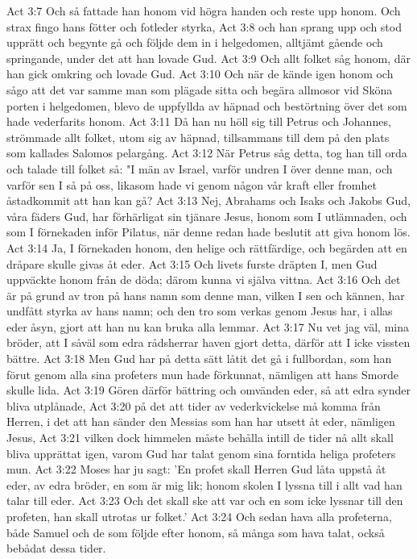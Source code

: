 Act 3:7  Och så fattade han honom vid högra handen och reste upp honom. Och strax fingo hans fötter och fotleder styrka,
Act 3:8  och han sprang upp och stod upprätt och begynte gå och följde dem in i helgedomen, alltjämt gående och springande, under det att han lovade Gud.
Act 3:9  Och allt folket såg honom, där han gick omkring och lovade Gud.
Act 3:10  Och när de kände igen honom och sågo att det var samme man som plägade sitta och begära allmosor vid Sköna porten i helgedomen, blevo de uppfyllda av häpnad och bestörtning över det som hade vederfarits honom.
Act 3:11  Då han nu höll sig till Petrus och Johannes, strömmade allt folket, utom sig av häpnad, tillsammans till dem på den plats som kallades Salomos pelargång.
Act 3:12  När Petrus såg detta, tog han till orda och talade till folket så: "I män av Israel, varför undren I över denne man, och varför sen I så på oss, likasom hade vi genom någon vår kraft eller fromhet åstadkommit att han kan gå?
Act 3:13  Nej, Abrahams och Isaks och Jakobs Gud, våra fäders Gud, har förhärligat sin tjänare Jesus, honom som I utlämnaden, och som I förnekaden inför Pilatus, när denne redan hade beslutit att giva honom lös.
Act 3:14  Ja, I förnekaden honom, den helige och rättfärdige, och begärden att en dråpare skulle givas åt eder.
Act 3:15  Och livets furste dräpten I, men Gud uppväckte honom från de döda; därom kunna vi själva vittna.
Act 3:16  Och det är på grund av tron på hans namn som denne man, vilken I sen och kännen, har undfått styrka av hans namn; och den tro som verkas genom Jesus har, i allas eder åsyn, gjort att han nu kan bruka alla lemmar.
Act 3:17  Nu vet jag väl, mina bröder, att I såväl som edra rådsherrar haven gjort detta, därför att I icke vissten bättre.
Act 3:18  Men Gud har på detta sätt låtit det gå i fullbordan, som han förut genom alla sina profeters mun hade förkunnat, nämligen att hans Smorde skulle lida.
Act 3:19  Gören därför bättring och omvänden eder, så att edra synder bliva utplånade,
Act 3:20  på det att tider av vederkvickelse må komma från Herren, i det att han sänder den Messias som han har utsett åt eder, nämligen Jesus,
Act 3:21  vilken dock himmelen måste behålla intill de tider nå allt skall bliva upprättat igen, varom Gud har talat genom sina forntida heliga profeters mun.
Act 3:22  Moses har ju sagt: 'En profet skall Herren Gud låta uppstå åt eder, av edra bröder, en som är mig lik; honom skolen I lyssna till i allt vad han talar till eder.
Act 3:23  Och det skall ske att var och en som icke lyssnar till den profeten, han skall utrotas ur folket.'
Act 3:24  Och sedan hava alla profeterna, både Samuel och de som följde efter honom, så många som hava talat, också bebådat dessa tider.
